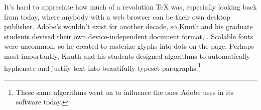 It's hard to appreciate how much of a revolution \TeX{} was,
especially looking back from today, where anybody with a web browser
can be their own desktop publisher.
Adobe's  wouldn't exist for another decade, so Knuth
and his graduate students devised their own device-independent document format,
.
Scalable fonts were uncommon, so he created \MF{} to rasterize glyphs
into dots on the page.
Perhaps most importantly, Knuth and his students designed algorithms
to automatically hyphenate and justify text into
beautifully-typeset paragraphs.\punckern\footnote{These same algorithms went
on to influence the ones Adobe uses in its software today.\punckern{}}

